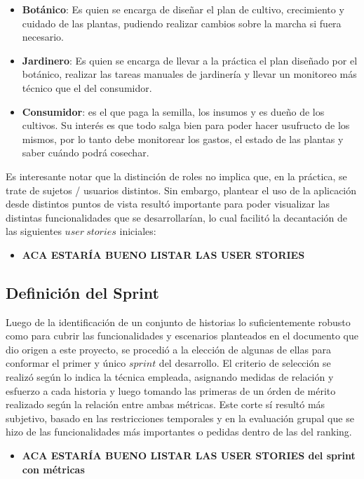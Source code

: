 \begin{itemize}
\item \textbf{Botánico}: Es quien se encarga de diseñar el plan de cultivo, crecimiento y cuidado de las plantas, pudiendo realizar cambios sobre la marcha si fuera necesario.
\item \textbf{Jardinero}: Es quien se encarga de llevar a la práctica el plan diseñado por el botánico, realizar las tareas manuales de jardinería y llevar un monitoreo más técnico que el del consumidor.
\item \textbf{Consumidor}: es el que paga la semilla, los insumos y es dueño de los cultivos. Su interés es que todo salga bien para poder hacer usufructo de los mismos, por lo tanto debe monitorear los gastos, el estado de las plantas y saber cuándo podrá cosechar.
\end{itemize}

Es interesante notar que la distinción de roles no implica que, en la práctica, se trate de sujetos / usuarios distintos. Sin embargo, plantear el uso de la aplicación desde distintos puntos de vista resultó importante para poder visualizar las distintas funcionalidades que se desarrollarían, lo cual facilitó la decantación de las siguientes $user\ stories$ iniciales:

\begin{itemize}
\item \textbf{ACA ESTARÍA BUENO LISTAR LAS USER STORIES}
\end{itemize}

\subsection{Definición del Sprint}

Luego de la identificación de un conjunto de historias lo suficientemente robusto como para cubrir las funcionalidades y escenarios planteados en el documento que dio origen a este proyecto, se procedió a la elección de algunas de ellas para conformar el primer y único $sprint$ del desarrollo. El criterio de selección se realizó según lo indica la técnica empleada, asignando medidas de relación y esfuerzo a cada historia y luego tomando las primeras de un órden de mérito realizado según la relación entre ambas métricas. Este corte sí resultó más subjetivo, basado en las restricciones temporales y en la evaluación grupal que se hizo de las funcionalidades más importantes o pedidas dentro de las del ranking.

\begin{itemize}
\item \textbf{ACA ESTARÍA BUENO LISTAR LAS USER STORIES del sprint con métricas}
\end{itemize}

